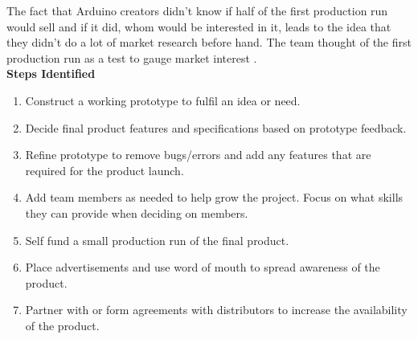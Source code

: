 The fact that Arduino creators didn't know if half of the first production run would sell and if it did, whom would be interested in it, leads to the idea that they didn't do a lot of market research before hand. The team thought of the first production run as a test to gauge market interest
\cite{RN111}. \\

\textbf{Steps Identified}
\begin{enumerate}
\item Construct a working prototype to fulfil an idea or need.
\item Decide final product features and specifications based on prototype feedback.
\item Refine prototype to remove bugs/errors and add any features that are required for the product launch.
\item Add team members as needed to help grow the project. Focus on what skills they can provide when deciding on members.
\item Self fund a small production run of the final product.
\item Place advertisements and use word of mouth to spread awareness of the product.
\item Partner with or form agreements with distributors to increase the availability of the product.
\end{enumerate} 

